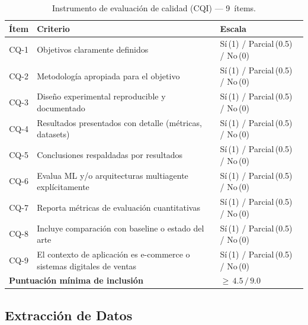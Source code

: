 \documentclass[12pt, a4paper]{article}
\begin{document}
\begin{table}[H]
\centering
\caption{Instrumento de evaluaci\'on de calidad (CQI) --- 9~\'items.}
\label{tab:calidad}
\begin{tabularx}{\linewidth}{clX}
\toprule
\textbf{\'Item} & \textbf{Criterio} & \textbf{Escala} \\
\midrule
CQ-1 & Objetivos claramente definidos &
       S\'i\,(1) / Parcial\,(0.5) / No\,(0) \\
CQ-2 & Metodolog\'ia apropiada para el objetivo &
       S\'i\,(1) / Parcial\,(0.5) / No\,(0) \\
CQ-3 & Dise\~no experimental reproducible y documentado &
       S\'i\,(1) / Parcial\,(0.5) / No\,(0) \\
CQ-4 & Resultados presentados con detalle (m\'etricas, datasets) &
       S\'i\,(1) / Parcial\,(0.5) / No\,(0) \\
CQ-5 & Conclusiones respaldadas por resultados &
       S\'i\,(1) / Parcial\,(0.5) / No\,(0) \\
CQ-6 & Evalua ML y/o arquitecturas multiagente expl\'icitamente &
       S\'i\,(1) / Parcial\,(0.5) / No\,(0) \\
CQ-7 & Reporta m\'etricas de evaluaci\'on cuantitativas &
       S\'i\,(1) / Parcial\,(0.5) / No\,(0) \\
CQ-8 & Incluye comparaci\'on con baseline o estado del arte &
       S\'i\,(1) / Parcial\,(0.5) / No\,(0) \\
CQ-9 & El contexto de aplicaci\'on es e-commerce o sistemas digitales
       de ventas &
       S\'i\,(1) / Parcial\,(0.5) / No\,(0) \\
\midrule
\multicolumn{2}{l}{\textbf{Puntuaci\'on m\'inima de inclusi\'on}} &
       $\geq\,4.5\,/\,9.0$ \\
\bottomrule
\end{tabularx}
\end{table}

\subsection{Extracci\'on de Datos}
\end{document}
